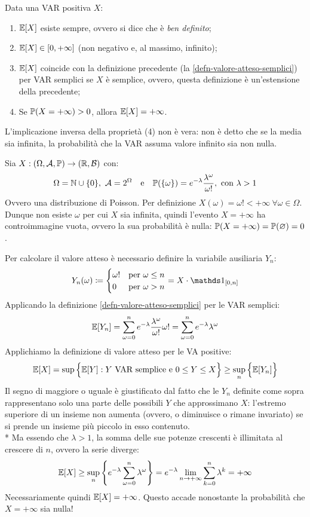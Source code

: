 \begin{prop}
  Data una VAR positiva $X$:
  \begin{enumerate}
    \item $\mathbb E[X]$ esiste sempre, ovvero si dice che è \emph{ben definito};
    \item $\mathbb E[X] \in [0,+\infty]$ (non negativo e, al massimo, infinito);
    \item $\mathbb E[X]$ coincide con la definizione precedente (la \ref{defn-valore-atteso-semplici}) per VAR semplici se $X$ è semplice, ovvero, questa definizione è un'estensione della precedente;
    \item Se $\mathbb P(X = +\infty) > 0$, allora $\mathbb E[X] = +\infty$.
  \end{enumerate}
\end{prop}

\medskip
L'implicazione inversa della proprietà (4) non è vera: non è detto che se la media sia infinita, la probabilità che la VAR assuma valore infinito sia non nulla.
\begin{cese}
	Sia $X:\DoCo[1]$ con:
	$$\Omega = \mathbb N \cup \{0\}, \ \mathcal A = 2^\Omega \quad \text{e} \quad \mathbb P(\{\omega\}) = e^{-\lambda} \frac{\lambda^{\omega}}{\omega !}, \text{ con } \lambda > 1$$
	Ovvero una distribuzione di Poisson.
	Per definizione $X(\omega) = \omega ! < +\infty \ \forall \omega \in \Omega$.
	Dunque non esiste $\omega$ per cui $X$ sia infinita, quindi l'evento $X = +\infty$ ha controimmagine vuota, ovvero la sua probabilità è nulla: $\mathbb P(X = +\infty) = \mathbb P(\varnothing) = 0$.

  Per calcolare il valore atteso è necessario definire la variabile ausiliaria $Y_n$:
  $$ Y_n(\omega) \coloneqq \begin{cases} \omega ! &\text{per } \omega \leq n \\ 0 &\text{per } \omega > n \end{cases} = X \cdot \Ind_{[0, n]}$$
  Applicando la definizione \ref{defn-valore-atteso-semplici} per le VAR semplici:
  $$ \mathbb E[Y_n] = \sum\limits_{\omega = 0}^{n} e^{-\lambda} \frac{\lambda^{\omega}}{\omega !} \omega ! = \sum\limits_{\omega = 0}^{n} e^{-\lambda}\lambda^{\omega}$$
  Applichiamo la definizione di valore atteso per le VA positive:
	$$\mathbb E[X] = \sup\Big\{\mathbb E[Y]: Y \text{ VAR semplice e } 0 \leq Y \leq X\Big\} \ge \sup_n\Big\{\mathbb E[Y_n]\Big\}$$
    Il segno di maggiore o uguale è giustificato dal fatto che le $Y_n$ definite come sopra rappresentano solo una parte delle possibili $Y$ che approssimano $X$:
    l'estremo superiore di un insieme non aumenta (ovvero, o diminuisce o rimane invariato) se si prende un insieme più piccolo in esso contenuto. \\*
    Ma essendo che $\lambda > 1$, la somma delle sue potenze crescenti è illimitata al crescere di $n$, ovvero la serie diverge:
    $$\mathbb E[X] \ge \sup_n \left\{ e^{-\lambda} \sum\limits_{\omega = 0}^{n} \lambda^\omega \right\} = e^{-\lambda} \lim_{n \to +\infty} \sum\limits_{k=0}^{n} \lambda^k = +\infty$$
	Necessariamente quindi $\mathbb E[X] = +\infty$.
	Questo accade nonostante la probabilità che $X = +\infty$ sia nulla!
\end{cese}

